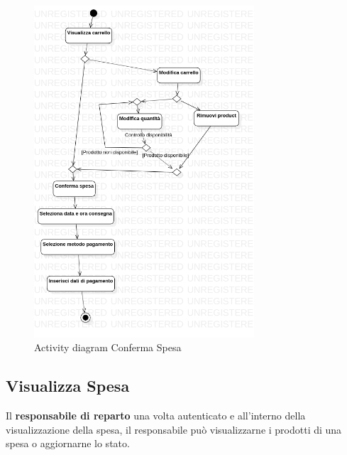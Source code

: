 \documentclass[12pt, a4paper]{report}
\begin{document}
\begin{figure}[h]
  \centering
  \includegraphics[width=0.73\textwidth]{Use Case Model!Conferma spesa!ActivityConfermSpesa!ActivityDiagramConfermaSpesa_14.png}
  \caption{Activity diagram Conferma Spesa}
\end{figure}

\newpage

\subsection{Visualizza Spesa}

Il \textbf{responsabile di reparto} una volta autenticato e all'interno della visualizzazione della spesa, il responsabile può visualizzarne i prodotti di una spesa o aggiornarne lo stato.
\end{document}
